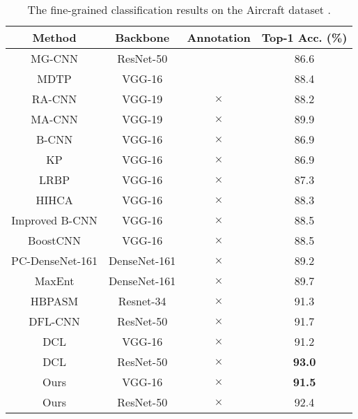 \documentclass[10pt,twocolumn,letterpaper]{article}
\begin{document}
\begin{table}[t]
    \centering
    \small{ \setlength{\tabcolsep}{1.0pt}
    \caption{The fine-grained classification results on the Aircraft dataset \cite{maji13fine-grained}.}
    \vspace{-2mm}
    \label{tab:aircraft}    
    \begin{tabular}{cccc}
    	\toprule
    	                      Method                       &   Backbone   & Annotation & Top-1 Acc. (\%) \\ \midrule
    	     MG-CNN \cite{DBLP:conf/iccv/WangSSZXZ15}      &  ResNet-50   & \checkmark &      86.6       \\
    	     MDTP \cite{DBLP:journals/corr/WangCMD16}      &    VGG-16    & \checkmark &      88.4       \\ \midrule
    	       RA-CNN \cite{DBLP:conf/cvpr/FuZM17}         &    VGG-19    &  $\times$  &      88.2       \\
    	     MA-CNN \cite{DBLP:conf/iccv/ZhengFML17}       &    VGG-19    &  $\times$  &      89.9       \\
    	       B-CNN \cite{DBLP:conf/iccv/LinRM15}         &    VGG-16    &  $\times$  &      86.9       \\
    	       KP \cite{DBLP:conf/cvpr/CuiZWLLB17}         &    VGG-16    &  $\times$  &      86.9       \\
    	      LRBP \cite{DBLP:journals/corr/KongF16}       &    VGG-16    &  $\times$  &      87.3       \\
    	       HIHCA \cite{DBLP:conf/iccv/CaiZZ17}         &    VGG-16    &  $\times$  &      88.3       \\
    	   Improved B-CNN \cite{DBLP:conf/bmvc/LinM17}     &    VGG-16    &  $\times$  &      88.5       \\
    	  BoostCNN \cite{DBLP:conf/bmvc/MoghimiBSYVL16}    &    VGG-16    &  $\times$  &      88.5       \\
    	PC-DenseNet-161 \cite{DBLP:conf/eccv/DubeyGGRFN18} & DenseNet-161 &  $\times$  &      89.2       \\
    	     MaxEnt \cite{DBLP:conf/nips/DubeyGRN18}       & DenseNet-161 &  $\times$  &      89.7       \\
    	              HBPASM \cite{8805063}                &  Resnet-34   &  $\times$  &      91.3       \\
    	      DFL-CNN \cite{DBLP:conf/cvpr/WangMD18}       &  ResNet-50   &  $\times$  &      91.7       \\
    	            DCL \cite{Chen_2019_CVPR}              &    VGG-16    &  $\times$  &      91.2       \\
    	            DCL \cite{Chen_2019_CVPR}              &  ResNet-50   &  $\times$  &  \textbf{93.0}  \\
	            \hline
    	                       Ours                        &    VGG-16    &  $\times$  &  \textbf{91.5}  \\
    	                       Ours                        &  ResNet-50   &  $\times$  &      92.4       \\ \bottomrule
    \end{tabular}}
\end{table}
\end{document}
